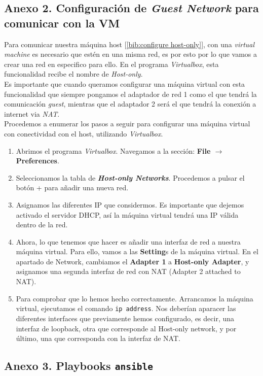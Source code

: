 \documentclass[12pt]{article}
\begin{document}
	\pagebreak
	
	\subsection*{Anexo 2. Configuración de \textit{Guest Network} para comunicar con la VM}
	\noindent Para comunicar nuestra máquina host [\ref{bib:configure host-only}], con una \textit{virtual machine} es necesario que estén en una misma red, es por esto por lo que vamos a crear una red en especifico para ello. En el programa \textit{Virtualbox}, esta funcionalidad recibe el nombre de \textit{Host-only}.\\
	
	\noindent Es importante que cuando queramos configurar una máquina virtual con esta funcionalidad que siempre pongamos el adaptador de red 1 como el que tendrá la comunicación \textit{guest}, mientras que el adaptador 2 será el que tendrá la conexión a internet via \textit{NAT}.\\
	
	\noindent Procedemos a enumerar los pasos a seguir para configurar una máquina virtual con conectividad con el host, utilizando \textit{Virtualbox}.
	
	\begin{enumerate}
		\item Abrimos el programa \textit{Virtualbox}. Navegamos a la sección: \textbf{File $\rightarrow$ Preferences}.
		\item Seleccionamos la tabla de \textbf{\textit{Host-only Networks}}. Procedemos a pulsar el botón + para añadir una nueva red.
		\item Asignamos las diferentes IP que considermos. Es importante que dejemos activado el servidor DHCP, así la máquina virtual tendrá una IP válida dentro de la red.
		\item Ahora, lo que tenemos que hacer es añadir una interfaz de red a nuestra máquina virtual. Para ello, vamos a las \textbf{Setting}s de la máquina virtual. En el apartado de Network, cambiamos el \textbf{Adapter 1} a\textbf{ Host-only Adapter}, y asignamos una segunda interfaz de red con NAT (Adapter 2 attached to NAT).
		\item Para comprobar que lo hemos hecho correctamente. Arrancamos la máquina virtual, ejecutamos el comando \texttt{ip address}. Nos deberían aparacer las diferentes interfaces que previamente hemos configurado, es decir, una interfaz de loopback, otra que corresponde al Host-only network, y por último, una que corresponda con la interfaz de NAT.
	\end{enumerate}
	
	\pagebreak
	\subsection*{Anexo 3. Playbooks \texttt{ansible}}
\end{document}
